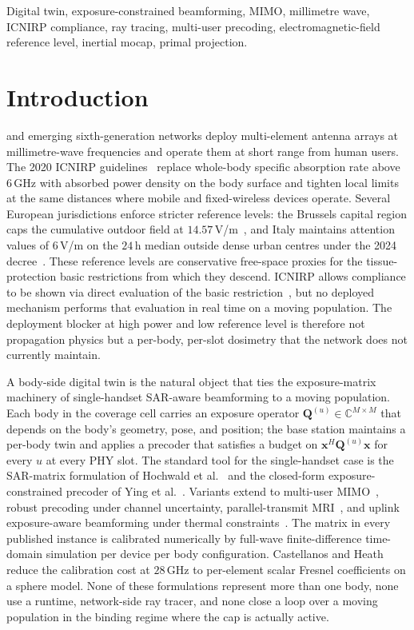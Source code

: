 \documentclass[journal,twocolumn,10pt]{IEEEtran}
\theoremstyle{plain}
\theoremstyle{remark}
\newcommand{\xx}{\mathbf{x}}
\newcommand{\Qmat}{\mathbf{Q}}
\newcommand{\Complex}{\mathbb{C}}
\begin{document}
\begin{IEEEkeywords}
Digital twin, exposure-constrained beamforming, MIMO, millimetre wave,
ICNIRP compliance, ray tracing, multi-user precoding,
electromagnetic-field reference level, inertial mocap, primal
projection.
\end{IEEEkeywords}

\IEEEpeerreviewmaketitle


\section{Introduction}\label{sec:intro}
 and emerging sixth-generation
networks deploy multi-element antenna arrays at millimetre-wave
frequencies and operate them at short range from human users. The
2020 ICNIRP guidelines~\cite{ICNIRP2020} replace whole-body specific
absorption rate above $6\,$GHz with absorbed power density on the
body surface and tighten local limits at the same distances where
mobile and fixed-wireless devices operate. Several European
jurisdictions enforce stricter reference levels: the Brussels capital
region caps the cumulative outdoor field at
$14.57\,$V/m~\cite{BrusselsArrete2007,BrusselsArrete2024}, and Italy
maintains attention values of $6\,$V/m on the $24\,$h median outside
dense urban centres under the 2024 decree~\cite{ItalyDL}. These
reference levels are conservative free-space proxies for the
tissue-protection basic restrictions from which they descend.
ICNIRP allows compliance to be shown via direct evaluation of the
basic restriction~\cite{IEC62232}, but no deployed mechanism
performs that evaluation in real time on a moving population. The
deployment blocker at high power and low reference level is therefore
not propagation physics but a per-body, per-slot dosimetry that the
network does not currently maintain.

A body-side digital twin is the natural object that ties the
exposure-matrix machinery of single-handset SAR-aware beamforming
to a moving population. Each body in the coverage cell carries an
exposure operator $\Qmat^{(u)} \in \Complex^{M\times M}$ that depends
on the body's geometry, pose, and position; the base station maintains
a per-body twin and applies a precoder that satisfies a budget on
$\xx^H \Qmat^{(u)} \xx$ for every $u$ at every PHY slot. The standard
tool for the single-handset case is the SAR-matrix formulation of
Hochwald et al.~\cite{Hochwald2014} and the closed-form
exposure-constrained precoder of Ying et al.~\cite{Ying2015}. Variants
extend to multi-user MIMO~\cite{Ying2017}, robust precoding under
channel uncertainty, parallel-transmit
MRI~\cite{MeliadoSAR2020,GokyarpTx2023}, and uplink exposure-aware
beamforming under thermal constraints~\cite{ZhouUL2026}. The matrix
in every published instance is calibrated numerically by full-wave
finite-difference time-domain simulation per device per body
configuration. Castellanos and Heath~\cite{Castellanos2020} reduce the
calibration cost at $28\,$GHz to per-element scalar Fresnel
coefficients on a sphere model. None of these formulations represent
more than one body, none use a runtime, network-side ray tracer, and
none close a loop over a moving population in the binding regime
where the cap is actually active.
\end{document}
